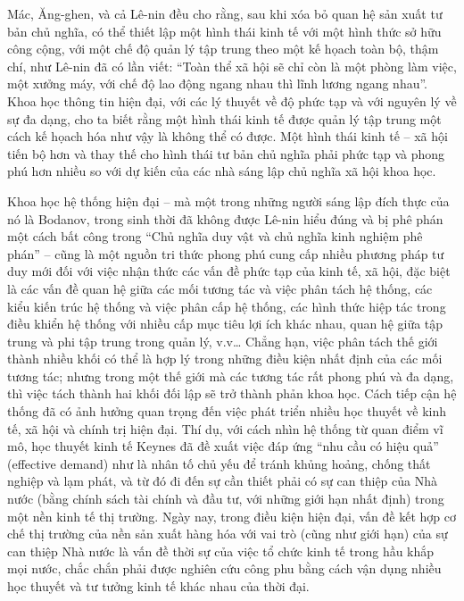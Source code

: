 Mác, Ăng-ghen, và cả Lê-nin đều cho rằng, sau khi xóa bỏ quan hệ sản xuất tư bản chủ nghĩa, có thể thiết lập một hình thái kinh tế với một hình thức sở hữu công cộng, với một chế độ quản lý tập trung theo một kế họach toàn bộ, thậm chí, như Lê-nin đã có lần viết: “Toàn thể xã hội sẽ chỉ còn là một phòng làm việc, một xưởng máy, với chế độ lao động ngang nhau thì lĩnh lương ngang nhau”. Khoa học thông tin hiện đại, với các lý thuyết về độ phức tạp và với nguyên lý về sự đa dạng, cho ta biết rằng một hình thái kinh tế được quản lý tập trung một cách kế họach hóa như vậy là không thể có được. Một hình thái kinh tế – xã hội tiến bộ hơn và thay thế cho hình thái tư bản chủ nghĩa phải phức tạp và phong phú hơn nhiều so với dự kiến của các nhà sáng lập chủ nghĩa xã hội khoa học.

Khoa học hệ thống hiện đại – mà một trong những người sáng lập đích thực của nó là Bodanov, trong sinh thời đã không được Lê-nin hiểu đúng và bị phê phán một cách bất công trong “Chủ nghĩa duy vật và chủ nghĩa kinh nghiệm phê phán” – cũng là một nguồn tri thức phong phú cung cấp nhiều phương pháp tư duy mới đối với việc nhận thức các vấn đề phức tạp của kinh tế, xã hội, đặc biệt là các vấn đề quan hệ giữa các mối tương tác và việc phân tách hệ thống, các kiểu kiến trúc hệ thống và việc phân cấp hệ thống, các hình thức hiệp tác trong điều khiển hệ thống với nhiều cấp mục tiêu lợi ích khác nhau, quan hệ giữa tập trung và phi tập trung trong quản lý, v.v… Chẳng hạn, việc phân tách thế giới thành nhiều khối có thể là hợp lý trong những điều kiện nhất định của các mối tương tác; nhưng trong một thế giới mà các tương tác rất phong phú và đa dạng, thì việc tách thành hai khối đối lập sẽ trở thành phản khoa học. Cách tiếp cận hệ thống đã có ảnh hưởng quan trọng đến việc phát triển nhiều học thuyết về kinh tế, xã hội và chính trị hiện đại. Thí dụ, với cách nhìn hệ thống từ quan điểm vĩ mô, học thuyết kinh tế Keynes đã đề xuất việc đáp ứng “nhu cầu có hiệu quả” (effective demand) như là nhân tố chủ yếu để tránh khủng hoảng, chống thất nghiệp và lạm phát, và từ đó đi đến sự cần thiết phải có sự can thiệp của Nhà nước (bằng chính sách tài chính và đầu tư, với những giới hạn nhất định) trong một nền kinh tế thị trường. Ngày nay, trong điều kiện hiện đại, vấn đề kết hợp cơ chế thị trường của nền sản xuất hàng hóa với vai trò (cũng như giới hạn) của sự can thiệp Nhà nước là vấn đề thời sự của việc tổ chức kinh tế trong hầu khắp mọi nước, chắc chắn phải được nghiên cứu công phu bằng cách vận dụng nhiều học thuyết và tư tưởng kinh tế khác nhau của thời đại.

